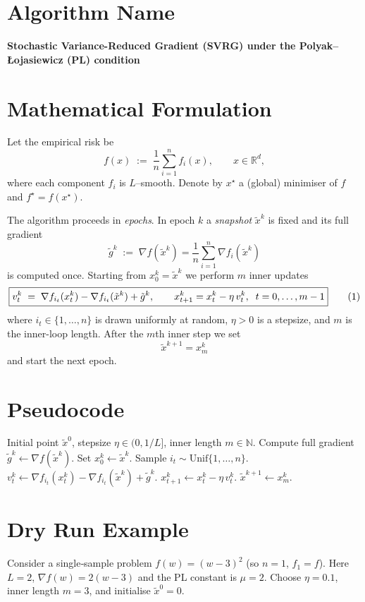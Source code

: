 \documentclass[11pt]{article}
\begin{document}
\section*{Algorithm Name}
\textbf{Stochastic Variance-Reduced Gradient (SVRG) under the Polyak–Łojasiewicz (PL) condition}

\section*{Mathematical Formulation}
Let the empirical risk be 
\[
f(x)\;:=\;\frac{1}{n}\sum_{i=1}^{n}f_i(x),\qquad x\in\mathbb{R}^{d},
\]
where each component $f_i$ is $L$–smooth.  
Denote by $x^{\star}$ a (global) minimiser of $f$ and $f^{\star}=f(x^{\star})$.

The algorithm proceeds in \emph{epochs}.  In epoch $k$ a \emph{snapshot}
$\tilde{x}^{k}$ is fixed and its full gradient
\[
\tilde{g}^{k}\;:=\;\nabla f(\tilde{x}^{k})=\frac{1}{n}\sum_{i=1}^{n}\nabla f_i(\tilde{x}^{k})
\]
is computed once.  Starting from $x_0^{k}=\tilde{x}^{k}$ we perform $m$ inner
updates
\[
\boxed{%
v_t^{k}\;=\;\nabla f_{i_t}(x_t^{k})-\nabla f_{i_t}(\tilde{x}^{k})+\tilde{g}^{k},\qquad 
x_{t+1}^{k}=x_t^{k}-\eta\,v_t^{k},\;\;t=0,\dots,m-1
}
\tag{1}
\]
where $i_t\in\{1,\dots,n\}$ is drawn uniformly at random, $\eta>0$ is a
stepsize, and $m$ is the inner-loop length.  After the $m$th inner step we set
\[
\tilde{x}^{k+1}=x_m^{k}
\]
and start the next epoch.

\section*{Pseudocode}
\begin{algorithm}[H]
\caption{SVRG with PL condition}
\begin{algorithmic}[1]
\Require Initial point $\tilde{x}^{0}$, stepsize $\eta\in(0,1/L]$, inner length $m\in\mathbb{N}$.
    \State Compute full gradient $\tilde{g}^{k}\gets\nabla f(\tilde{x}^{k})$.
    \State Set $x_{0}^{k}\gets\tilde{x}^{k}$.
        \State Sample $i_t\sim\mathrm{Unif}\{1,\dots,n\}$.
        \State $v_t^{k}\gets\nabla f_{i_t}(x_t^{k})-\nabla f_{i_t}(\tilde{x}^{k})+\tilde{g}^{k}$.
        \State $x_{t+1}^{k}\gets x_t^{k}-\eta\,v_t^{k}$.
    \EndFor
    \State $\tilde{x}^{k+1}\gets x_{m}^{k}$.
\EndFor
\end{algorithmic}
\end{algorithm}

\section*{Dry Run Example}
Consider a single‑sample problem $f(w)=(w-3)^{2}$ (so $n=1$, $f_{1}=f$).  
Here $L=2$, $\nabla f(w)=2(w-3)$ and the PL constant is $\mu=2$.
Choose $\eta=0.1$, inner length $m=3$, and initialise $\tilde{x}^{0}=0$.
\end{document}
